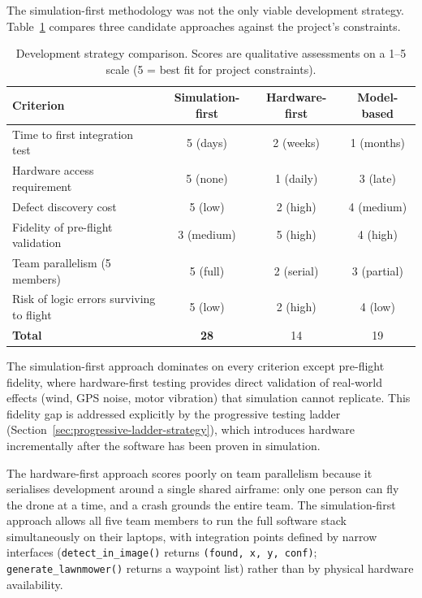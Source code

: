 The simulation-first methodology was not the only viable development strategy.
Table~\ref{tab:dev-strategy-comparison} compares three candidate approaches against the project's constraints.

\begin{table}[ht]
  \centering\compactTable
  \caption{Development strategy comparison. Scores are qualitative assessments on a 1--5 scale (5 = best fit for project constraints).}\label{tab:dev-strategy-comparison}
  \begin{tabularx}{\linewidth}{@{}X c c c@{}}
    \toprule
    \textbf{Criterion} & \textbf{Simulation-first} & \textbf{Hardware-first} & \textbf{Model-based} \\
    \midrule
    Time to first integration test      & 5 (days)   & 2 (weeks)  & 1 (months) \\
    Hardware access requirement          & 5 (none)   & 1 (daily)  & 3 (late)   \\
    Defect discovery cost                & 5 (low)    & 2 (high)   & 4 (medium) \\
    Fidelity of pre-flight validation    & 3 (medium) & 5 (high)   & 4 (high)   \\
    Team parallelism (5 members)         & 5 (full)   & 2 (serial) & 3 (partial)\\
    Risk of logic errors surviving to flight & 5 (low) & 2 (high)  & 4 (low)    \\
    \midrule
    \textbf{Total}                       & \textbf{28} & 14         & 19         \\
    \bottomrule
  \end{tabularx}
\end{table}

The simulation-first approach dominates on every criterion except pre-flight fidelity, where hardware-first testing provides direct validation of real-world effects (wind, GPS noise, motor vibration) that simulation cannot replicate.
This fidelity gap is addressed explicitly by the progressive testing ladder (Section~\ref{sec:progressive-ladder-strategy}), which introduces hardware incrementally after the software has been proven in simulation.

The hardware-first approach scores poorly on team parallelism because it serialises development around a single shared airframe: only one person can fly the drone at a time, and a crash grounds the entire team.
The simulation-first approach allows all five team members to run the full software stack simultaneously on their laptops, with integration points defined by narrow interfaces (\texttt{detect\_in\_image()} returns \texttt{(found, x, y, conf)}; \texttt{generate\_lawnmower()} returns a waypoint list) rather than by physical hardware availability.

